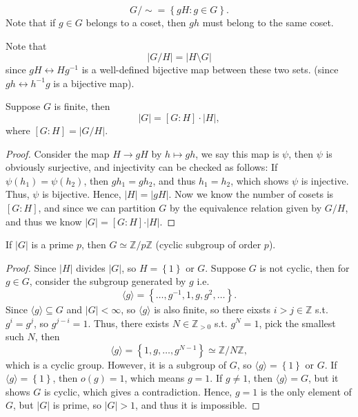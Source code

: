 \begin{prev}
    \[
        G / \sim = \left\{ g H: g \in G \right\}. 
    \]
    Note that if \(g \in G\) belongs to a coset, then \(gh\) must belong to the same coset.   
\end{prev}

Note that 
\[
    \left\vert G / H \right\vert = \left\vert H \setminus G \right\vert 
\] since \(gH \leftrightarrow Hg^{-1}\) is a well-defined bijective map between these two sets. (since \(gh \leftrightarrow h^{-1} g\) is a bijective map). 

\begin{theorem}
    Suppose \(G\) is finite, then 
    \[
        \left\vert G \right\vert = [G : H] \cdot \left\vert H \right\vert,  
    \] where \([G:H] = \vert G / H \vert \). 
\end{theorem}
\begin{proof}
    Consider the map \(H \to gH\) by \(h \mapsto gh\), we say this map is \(\psi \), then \(\psi \) is obviously surjective, and injectivity can be checked as follows: If \(\psi (h_1) = \psi (h_2)\), then \(g h_1 = g h_2\), and thus \(h_1 = h_2\), which shows \(\psi \) is injective. Thus, \(\psi \) is bijective. Hence, \(\vert H \vert = \vert gH \vert  \). Now we know the number of cosets is \([G:H]\), and since we can partition \(G\) by the equivalence relation given by \(G / H\), and thus we know \(\vert G \vert = [G:H] \cdot \vert H \vert  \).               
\end{proof}

\begin{proposition}
    If \(\vert G \vert \) is a prime \(p\), then \(G \simeq \mathbb{Z} / p\mathbb{Z} \) (cyclic subgroup of order \(p\)).   
\end{proposition}
\begin{proof}
    Since \(\vert H \vert \) divides \(\vert G \vert \), so \(H = \left\{ 1 \right\} \) or \(G\). Suppose \(G\) is not cyclic, then for \(g \in G\), consider the subgroup generated by \(g\) i.e. 
    \[
        \langle g \rangle = \left\{ \dots , g^{-1}, 1, g, g^2, \dots  \right\}. 
    \]
    Since \(\langle g \rangle \subseteq G\) and \(\vert G \vert < \infty  \), so \(\langle g \rangle \) is also finite, so there eixsts \(i > j \in \mathbb{Z} \) s.t. \(g^i = g^j\), so \(g^{j - i} = 1\). Thus, there exists \(N \in \mathbb{Z} _{> 0}\) s.t. \(g^N = 1\), pick the smallest such \(N\), then
    \[
        \langle g \rangle = \left\{ 1, g, \dots , g^{N-1} \right\} \simeq \mathbb{Z} / N \mathbb{Z}, 
    \] which is a cyclic group. However, it is a subgroup of \(G\), so \(\langle g \rangle = \left\{ 1 \right\}   \) or \(G\). If \(\langle g \rangle = \left\{ 1 \right\}  \), then \(o(g) = 1\), which means \(g = 1\). If \(g \neq 1\), then \(\langle g \rangle = G\), but it shows \(G\) is cyclic, which gives a contradiction. Hence, \(g = 1\) is the only element of \(G\), but \(\vert G \vert \) is prime, so \(\vert G \vert > 1 \), and thus it is impossible.     
\end{proof}

